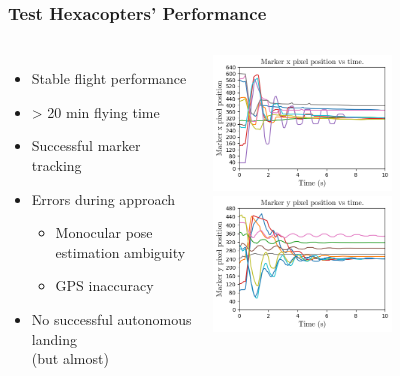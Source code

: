 \documentclass[aspectratio=169]{rubeamer}
\begin{document}
\begin{frame}
  \frametitle{Test Hexacopters' Performance}
  \begin{columns}
    \begin{itemize}
      \item Stable flight performance
      \item > 20 min flying time
      \item Successful marker tracking
      \item Errors during approach
      \begin{itemize}
        \item Monocular pose estimation ambiguity
        \item GPS inaccuracy
      \end{itemize}
      \item No successful autonomous landing\\(but almost)
    \end{itemize}
    \centering
    \includegraphics[width=0.6\textwidth]{coral_gimbal_performance_x_axis}\\
    \includegraphics[width=0.6\textwidth]{coral_gimbal_performance_y_axis}\\
  \end{columns}
\end{frame}
\end{document}
